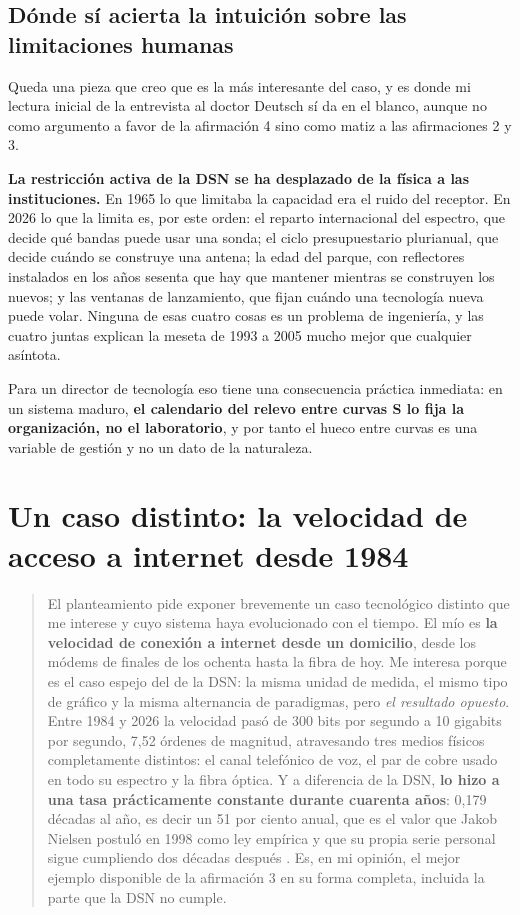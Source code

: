 \documentclass[11pt,letterpaper]{article}
\begin{document}
\subsection*{Dónde sí acierta la intuición sobre las limitaciones humanas}

Queda una pieza que creo que es la más interesante del caso, y es donde mi
lectura inicial de la entrevista al doctor Deutsch \parencite{deutsch2026} sí
da en el blanco, aunque no como argumento a favor de la afirmación 4 sino como
matiz a las afirmaciones 2 y 3.

\textbf{La restricción activa de la DSN se ha desplazado de la física a las
instituciones.} En 1965 lo que limitaba la capacidad era el ruido del
receptor. En 2026 lo que la limita es, por este orden: el reparto
internacional del espectro, que decide qué bandas puede usar una sonda; el
ciclo presupuestario plurianual, que decide cuándo se construye una antena; la
edad del parque, con reflectores instalados en los años sesenta que hay que
mantener mientras se construyen los nuevos; y las ventanas de lanzamiento, que
fijan cuándo una tecnología nueva puede volar. Ninguna de esas cuatro cosas es
un problema de ingeniería, y las cuatro juntas explican la meseta de 1993 a
2005 mucho mejor que cualquier asíntota.

Para un director de tecnología eso tiene una consecuencia práctica inmediata:
en un sistema maduro, \textbf{el calendario del relevo entre curvas S lo fija
la organización, no el laboratorio}, y por tanto el hueco entre curvas es una
variable de gestión y no un dato de la naturaleza.

\section{Un caso distinto: la velocidad de acceso a internet desde 1984}
\label{sec:internet}

\begin{quote}
El planteamiento pide exponer brevemente un caso tecnológico distinto que me
interese y cuyo sistema haya evolucionado con el tiempo. El mío es \textbf{la
velocidad de conexión a internet desde un domicilio}, desde los módems de
finales de los ochenta hasta la fibra de hoy. Me interesa porque es el caso
espejo del de la DSN: la misma unidad de medida, el mismo tipo de gráfico y la
misma alternancia de paradigmas, pero \emph{el resultado opuesto}. Entre 1984
y 2026 la velocidad pasó de 300 bits por segundo a 10 gigabits por segundo,
7,52 órdenes de magnitud, atravesando tres medios físicos completamente
distintos: el canal telefónico de voz, el par de cobre usado en todo su
espectro y la fibra óptica. Y a diferencia de la DSN, \textbf{lo hizo a una
tasa prácticamente constante durante cuarenta años}: 0,179 décadas al año, es
decir un 51 por ciento anual, que es el valor que Jakob Nielsen postuló en
1998 como ley empírica y que su propia serie personal sigue cumpliendo dos
décadas después \parencite{nielsen2019}. Es, en mi opinión, el mejor ejemplo
disponible de la afirmación 3 en su forma completa, incluida la parte que la
DSN no cumple.
\end{quote}
\end{document}
